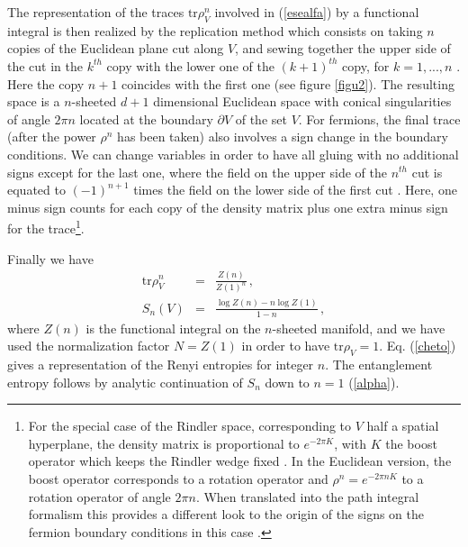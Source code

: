 \documentclass[a4paper]{article}
\begin{document}
The representation of the traces $\textrm{tr}\rho_V^n$ involved in (\ref{esealfa}) by a functional integral is then realized by the replication method which consists on taking $n$ copies of the Euclidean plane cut along $V$, and sewing together the upper side of the cut in the $k^{th}$ copy with
the lower one of the $(k+1)^{th}$ copy, for $ k=1,...,n$ \cite{cw,cc}. Here the copy $n+1$ coincides with the first one (see figure \ref{figu2}). The resulting space is a $n$-sheeted $d+1$ dimensional Euclidean space with conical singularities of angle $2\pi n$ located at the boundary $\partial V$ of the set $V$. For fermions, the final trace (after the power $\rho^n$ has been taken) also involves a sign change in the boundary conditions. We can change variables in order to have all gluing with no additional signs except for the last one, where the field on the upper side of the $n^{th}$ cut is equated to $(-1)^{n+1}$ times the field on the lower side of the first cut \cite{fermion}. Here, one minus sign counts for each copy of the density matrix plus one extra minus sign for the trace\footnote{For the special case of the Rindler space, corresponding to $V$ half a spatial hyperplane, the density matrix is proportional to $e^{-2\pi K}$, with $K$ the boost operator which keeps the Rindler wedge fixed \cite{boostwedge}. In the Euclidean version, the boost operator corresponds to a rotation operator and  $\rho^n=e^{-2\pi n K}$ to a rotation operator of angle $2 \pi n$. When translated into the path integral formalism this provides a different look to the origin of the signs on the fermion boundary conditions in this case \cite{Kabat}.}. 

Finally we have  
\begin{eqnarray}
\textrm{tr}\rho_V^{n}&=& \frac{Z(n)}{Z(1)^{n}}\,,\\
S_n(V)&=& \frac{\log Z(n)-n \log Z(1)}{1-n}\label{cheto}\,,
\label{dd}
\end{eqnarray}
where $Z(n)$ is the functional integral on the $n$-sheeted manifold, and we have used the normalization factor $N=Z(1)$ in order to have $\textrm{tr} \rho_V=1$. 
Eq. (\ref{cheto}) gives a representation of the Renyi entropies for integer $n$. The entanglement entropy follows by analytic continuation of $S_n$ down to $n=1$ (\ref{alpha}).
\end{document}
